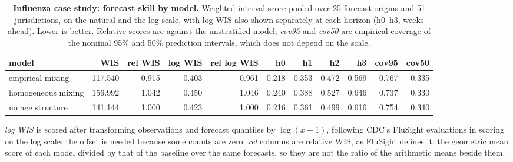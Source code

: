 \begin{table}[tb]
\centering
\caption{\textbf{Influenza case study: forecast skill by model.} Weighted interval score pooled over 25 forecast origins and 51 jurisdictions, on the natural and the log scale, with log WIS also shown separately at each horizon (h0--h3, weeks ahead). Lower is better. Relative scores are against the unstratified model; \emph{cov95} and \emph{cov50} are empirical coverage of the nominal 95\% and 50\% prediction intervals, which does not depend on the scale.}
\label{tab:flu-skill}
\footnotesize
\setlength{\tabcolsep}{5pt}
\begin{tabular}{@{}lrrrrrrrrrr@{}}
\toprule
model & \textbf{WIS} & \textbf{rel WIS} & \textbf{log WIS} & \textbf{rel log WIS} & \textbf{h0} & \textbf{h1} & \textbf{h2} & \textbf{h3} & \textbf{cov95} & \textbf{cov50} \\
\midrule
empirical mixing & 117.540 & 0.915 & 0.403 & 0.961 & 0.218 & 0.353 & 0.472 & 0.569 & 0.767 & 0.335 \\
homogeneous mixing & 156.992 & 1.042 & 0.450 & 1.046 & 0.240 & 0.388 & 0.527 & 0.646 & 0.737 & 0.330 \\
no age structure & 141.144 & 1.000 & 0.423 & 1.000 & 0.216 & 0.361 & 0.499 & 0.616 & 0.754 & 0.340 \\
\bottomrule
\end{tabular}
\par\medskip\raggedright\scriptsize \emph{log WIS} is scored after transforming observations and forecast quantiles by $\log(x+1)$, following CDC's FluSight evaluations in scoring on the log scale; the offset is needed because some counts are zero. \emph{rel} columns are relative WIS, as FluSight defines it: the geometric mean score of each model divided by that of the baseline over the same forecasts, so they are not the ratio of the arithmetic means beside them.
\end{table}
